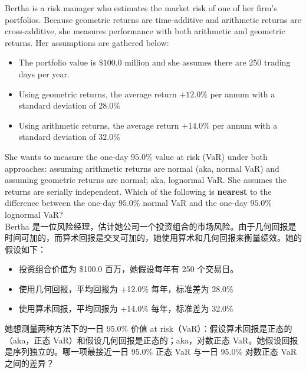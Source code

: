 \documentclass{article}
\newcounter{question} %
\begin{document}
\begin{question}
    Bertha is a risk manager who estimates the market risk of one of her firm’s portfolios. Because geometric returns are time-additive and arithmetic returns are cross-additive, she measures performance with both arithmetic and geometric returns. Her assumptions are gathered below:
    \begin{itemize}
        \item The portfolio value is $\$100.0$ million and she assumes there are 250 trading days per year.
        \item Using geometric returns, the average return $+12.0\%$ per annum with a standard deviation of $28.0\%$
        \item Using arithmetic returns, the average return $+14.0\%$ per annum with a standard deviation of $32.0\%$
    \end{itemize}
    She wants to measure the one-day $95.0\%$ value at risk (VaR) under both approaches: assuming arithmetic returns are normal (aka, normal VaR) and assuming geometric returns are normal; aka, lognormal VaR. She assumes the returns are serially independent. Which of the following is \textbf{nearest} to the difference between the one-day $95.0\%$ normal VaR and the one-day $95.0\%$ lognormal VaR?\\
    Bertha 是一位风险经理，估计她公司一个投资组合的市场风险。由于几何回报是时间可加的，而算术回报是交叉可加的，她使用算术和几何回报来衡量绩效。她的假设如下：
    \begin{itemize}
        \item 投资组合价值为 \$100.0 百万，她假设每年有 250 个交易日。
        \item 使用几何回报，平均回报为 +12.0\% 每年，标准差为 28.0\%
        \item 使用算术回报，平均回报为 +14.0\% 每年，标准差为 32.0\%
    \end{itemize}
    她想测量两种方法下的一日 $95.0\%$ 价值 at risk（VaR）：假设算术回报是正态的（aka，正态 VaR）和假设几何回报是正态的；aka，对数正态 VaR。她假设回报是序列独立的。哪一项最接近一日 $95.0\%$ 正态 VaR 与一日 $95.0\%$ 对数正态 VaR 之间的差异？
\end{question}
\end{document}
